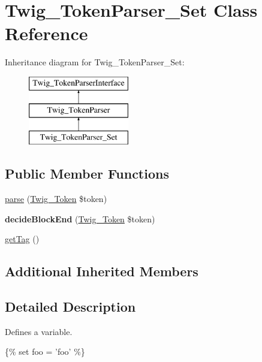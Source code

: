 \hypertarget{classTwig__TokenParser__Set}{}\section{Twig\+\_\+\+Token\+Parser\+\_\+\+Set Class Reference}
\label{classTwig__TokenParser__Set}
Inheritance diagram for Twig\+\_\+\+Token\+Parser\+\_\+\+Set\+:\begin{figure}[H]
\begin{center}
\leavevmode
\includegraphics[height=3.000000cm]{classTwig__TokenParser__Set}
\end{center}
\end{figure}
\subsection*{Public Member Functions}
\begin{DoxyCompactItemize}
\item 
\hyperlink{classTwig__TokenParser__Set_ac6f4b9ee6fffaff88a53006c842b0bc1}{parse} (\hyperlink{classTwig__Token}{Twig\+\_\+\+Token} \$token)
\item 
{\bfseries decide\+Block\+End} (\hyperlink{classTwig__Token}{Twig\+\_\+\+Token} \$token)\hypertarget{classTwig__TokenParser__Set_a38efe103d575d49379679acdb115e4ae}{}\label{classTwig__TokenParser__Set_a38efe103d575d49379679acdb115e4ae}

\item 
\hyperlink{classTwig__TokenParser__Set_abff38d0b6e506e7fa5ab062cd7f8da6e}{get\+Tag} ()
\end{DoxyCompactItemize}
\subsection*{Additional Inherited Members}


\subsection{Detailed Description}
Defines a variable.


\begin{DoxyPre}
 \{\% set foo = 'foo' \%\}\end{DoxyPre}



